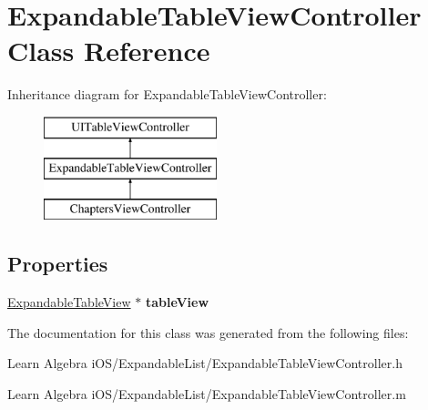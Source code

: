 \hypertarget{interface_expandable_table_view_controller}{\section{Expandable\-Table\-View\-Controller Class Reference}
\label{interface_expandable_table_view_controller}
}
Inheritance diagram for Expandable\-Table\-View\-Controller\-:\begin{figure}[H]
\begin{center}
\leavevmode
\includegraphics[height=3.000000cm]{interface_expandable_table_view_controller}
\end{center}
\end{figure}
\subsection*{Properties}
\begin{DoxyCompactItemize}
\item 
\hypertarget{interface_expandable_table_view_controller_a8b59aa4e66bcf998541596dd33678345}{\hyperlink{interface_expandable_table_view}{Expandable\-Table\-View} $\ast$ {\bfseries table\-View}}\label{interface_expandable_table_view_controller_a8b59aa4e66bcf998541596dd33678345}

\end{DoxyCompactItemize}


The documentation for this class was generated from the following files\-:\begin{DoxyCompactItemize}
\item 
Learn Algebra i\-O\-S/\-Expandable\-List/Expandable\-Table\-View\-Controller.\-h\item 
Learn Algebra i\-O\-S/\-Expandable\-List/Expandable\-Table\-View\-Controller.\-m\end{DoxyCompactItemize}
